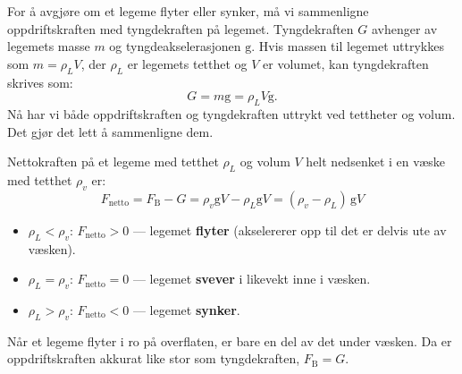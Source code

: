 For å avgjøre om et legeme flyter eller synker, må vi sammenligne oppdriftskraften med tyngdekraften på legemet. Tyngdekraften \( G \) avhenger av legemets masse \( m \) og tyngdeakselerasjonen \( \mathrm{g} \). Hvis massen til legemet uttrykkes som \( m = \rho_L V \), der \( \rho_L \) er legemets tetthet og \( V \) er volumet, kan tyngdekraften skrives som:
\[
G = m \mathrm{g} = \rho_L V \mathrm{g}.
\]
Nå har vi både oppdriftskraften og tyngdekraften uttrykt ved tettheter og volum. Det gjør det lett å sammenligne dem.

Nettokraften på et legeme med tetthet $\rho_L$ og volum $V$ helt nedsenket i en væske med tetthet $\rho_v$ er:
\[
  F_{\text{netto}} = F_{\textrm{B}} - G = \rho_v \mathrm{g} V - \rho_L \mathrm{g} V = (\rho_v - \rho_L)\,\mathrm{g} V
\]

\begin{tcolorbox}[colback=gray!13, colframe=gray!40, boxrule=0.5pt,
    arc=2pt, left=6pt, right=6pt, top=4pt, bottom=4pt]
\begin{itemize}
  \item $\rho_L < \rho_v$: $F_{\text{netto}} > 0$ — legemet \textbf{flyter} (akselererer opp til det er delvis ute av væsken).
  \item $\rho_L = \rho_v$: $F_{\text{netto}} = 0$ — legemet \textbf{svever} i likevekt inne i væsken.
  \item $\rho_L > \rho_v$: $F_{\text{netto}} < 0$ — legemet \textbf{synker}.
\end{itemize}
\end{tcolorbox}

Når et legeme flyter i ro på overflaten, er bare en del av det under væsken. Da er oppdriftskraften akkurat like stor som tyngdekraften, $F_{\textrm{B}} = G$.




